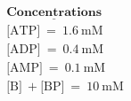 \documentclass[10pt]{article}
\begin{document}
\begin{align*}\underline{\textbf{Concentrations}} \\ 
\text{[ATP]}\ = \ 1.6\ \text{mM}\\
\text{[ADP]}\ = \ 0.4\ \text{mM}\\
\text{[AMP]}\ = \ 0.1\ \text{mM}\\
\text{[B]}\ + \text{[BP]}\ = \ 10\ \text{mM}\\
\end{align*}
\end{document}
